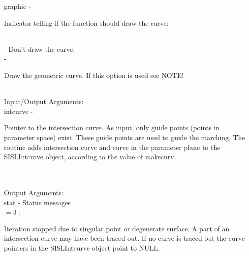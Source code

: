         \>\>    {\fov graphic}\> - \>   \begin{minipg2}
                                Indicator telling if the function
                                should draw the curve:
                                \end{minipg2}\\
                \>\>\>\> -     \>Don't draw the curve.\\
                \>\>\>\> -     \>\begin{minipg5}
                                        Draw the geometric curve. If this option
                                        is used see NOTE!
                                        \end{minipg5} \\[0.8ex]
\newpagetabs
        \>Input/Output Arguments:\\
        \>\>    {\fov intcurve}\> - \>  \begin{minipg2}
                                Pointer to the intersection curve.
                                As input, only
                                guide points (points in parameter space)
                                exist. These guide points
                                are used to guide the marching.
                                The routine adds
                                intersection curve and curve in the parameter
                                plane to the SISLIntcurve object, according to the value
                                of makecurv.
                                \end{minipg2}\\[0.8ex]
\\
        \>Output Arguments:\\
        \>\>    {\fov stat}     \> - \> Status messages\\
                \>\>\>\>\>      $= 3$ : \>      \begin{minipg5}
                                                Iteration stopped due to singular
                                                point or degenerate surface. A part of an
                                                intersection curve may have been
                                                traced out. If no curve is traced out
                                                the curve pointers in the SISLIntcurve
                                                object point to NULL.
                                                \end{minipg5} \\[0.3ex]
